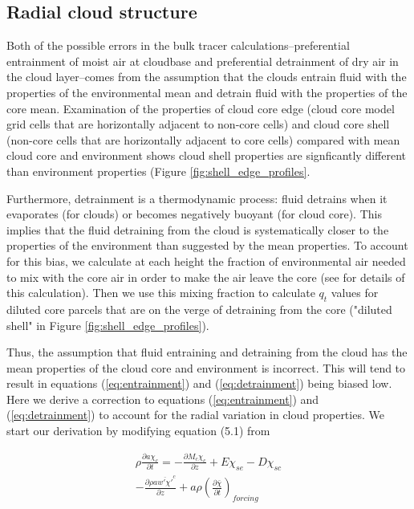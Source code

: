 \documentclass[12pt]{article}
\begin{document}

\subsection{Radial cloud structure}

Both of the possible errors in the bulk tracer calculations--preferential
entrainment of moist air at cloudbase and preferential detrainment of dry air
in the cloud layer--comes from the assumption that the clouds entrain fluid
with the properties of the environmental mean and detrain fluid with the
properties of the core mean.  Examination of the properties of cloud core edge
(cloud core model grid cells that are horizontally adjacent to non-core cells)
and cloud core shell (non-core cells that are horizontally adjacent to core
cells) compared with mean cloud core and environment shows cloud shell
properties are signficantly different than environment properties (Figure 
\ref{fig:shell_edge_profiles}.

Furthermore, detrainment is a thermodynamic process: fluid detrains when it 
evaporates (for clouds) or becomes negatively buoyant (for cloud core).  This 
implies that the fluid detraining from the cloud is systematically closer to 
the properties of the environment than suggested by the mean properties.  To 
account for this bias, we calculate at each height the fraction of 
environmental air needed to mix with the core air in order to make the air 
leave the core (see \cite{Rooy2008} for details of this calculation).  Then we 
use this mixing fraction to calculate $q_t$ values for diluted core parcels 
that are on the verge of detraining from the core ("diluted shell" in Figure
\ref{fig:shell_edge_profiles}).

Thus, the assumption that fluid entraining and detraining from the cloud has 
the mean properties of the cloud core and environment is incorrect.  This will 
tend to result in equations (\ref{eq:entrainment}) and (\ref{eq:detrainment}) 
being biased low.  Here we derive a correction to equations 
(\ref{eq:entrainment}) and (\ref{eq:detrainment}) to account for the radial 
variation in cloud properties.  We start our derivation by modifying equation 
(5.1) from \cite{Siebesma1995}

\begin{equation}
  \label{eq:derivation_entrainment}
  \begin{split}
    \rho \frac{\partial a \chi_c}{\partial t} 
    = - \frac{\partial M_c \chi_c}{\partial z} 
    + E \chi_{se} - D \chi_{sc} \\
    - \frac{\partial \rho a \overline{w' \chi'}^c}{\partial z} 
    + a \rho \left(\frac{\partial \bar{\chi}}{\partial t}\right)_{forcing}
  \end{split}
\end{equation}
\end{document}
